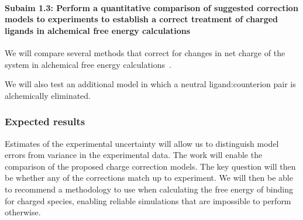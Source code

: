 \documentclass[10pt,final]{article}
\newcommand{\subsubsubsection}[1]{\paragraph*{#1}}
\begin{document}
%  



\subsubsubsection{Subaim 1.3: Perform a quantitative comparison of suggested correction models to experiments to establish a correct treatment of charged ligands in alchemical free energy calculations}
We will compare several methods that correct for changes in net charge of the system in alchemical free energy calculations~\cite{Reif2013a,Rocklin2013a}.


We will also test an additional model in which a neutral ligand:counterion pair is alchemically eliminated.

\subsubsection*{Expected results}
Estimates of the experimental uncertainty will allow us to distinguish model errors from variance in the experimental data.
The work will enable the comparison of the proposed charge correction models. 
The key question will then be whether any of the corrections  match up to experiment.
We will then be able to recommend a methodology to use when calculating the free energy of binding for charged species, enabling reliable simulations that are impossible to perform otherwise.
\end{document}
